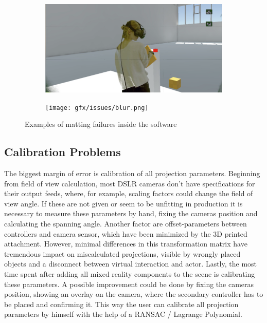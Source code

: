 \begin{figure}
	\begin{subfigure}[t]{.45\textwidth}
		\centering
		\includegraphics[width=\textwidth]{gfx/issues/spill.png}
	\end{subfigure}
	\begin{subfigure}[t]{.45\textwidth}
		\centering
		\texttt{[image: gfx/issues/blur.png]}
	\end{subfigure}
	\label{fig:issue:blur}
	\caption{Examples of matting failures inside the software}
\end{figure}

\subsection{Calibration Problems}

The biggest margin of error is calibration of all projection parameters.
\newline
Beginning from field of view calculation, most DSLR cameras don't have 
specifications for their output feeds, where, for example, scaling factors 
could change the field of view angle. If these are not given or seem to be 
unfitting in production it is necessary to measure these parameters by hand, 
fixing the cameras position and calculating the spanning angle.
Another factor are offset-parameters between controllers and camera sensor, 
which have been minimized by the 3D printed attachment. However, minimal 
differences in this transformation matrix have tremendous impact on 
miscalculated projections, visible by wrongly placed objects and a disconnect 
between virtual interaction and actor.
Lastly, the most time spent after adding all mixed reality components to the 
scene is calibrating these parameters. A possible improvement could be done by 
fixing the cameras position, showing an overlay on the camera, where the 
secondary controller has to be placed and confirming it. This way the user can 
calibrate all projection parameters by himself with the help of a RANSAC / 
Lagrange Polynomial.
